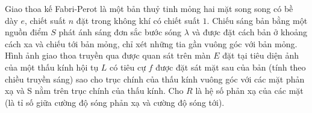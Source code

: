 Giao thoa kế Fabri-Perot là một bản thuỷ tinh mỏng hai mặt song song có bề dày $e$, chiết suất $n$ đặt trong không khí có chiết suất $1$. Chiếu sáng bản bằng một nguồn điểm $S$ phát ánh sáng đơn sắc bước sóng $\lambda$ và được đặt cách bản ở khoảng cách xa và chiếu tới bản mỏng, chỉ xét những tia gần vuông góc với bản mỏng. Hình ảnh giao thoa truyền qua được quan sát trên màn $E$ đặt tại tiêu diện ảnh của một thấu kính hội tụ $L$ có tiêu cự $f$ được đặt sát mặt sau của bản (tính theo chiều truyền sáng) sao cho trục chính của thấu kính vuông góc với các mặt phản xạ và S nằm trên trục chính của thấu kính. Cho $R$ là hệ số phản xạ của các mặt (là tỉ số giữa cường độ sóng phản xạ và cường độ sóng tới).


%
%
